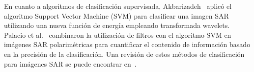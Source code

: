 \documentclass[11pt]{article}
\begin{document}
En cuanto a algoritmos de clasificación supervisada, Akbarizadeh~\cite{Akbarizadeh2012} aplicó el algoritmo Support Vector Machine (SVM) para clasificar una imagen SAR utilizando una nueva función de energía empleando transformada wavelets. 
Palacio et al.~\cite{Palacio2019} combinaron la utilización de filtros con el algoritmo SVM en imágenes SAR polarimétricas para cuantificar el contenido de información basado en la precisión de la clasificación.  
Una revisión de estos métodos de clasificación para imágenes SAR se puede encontrar en~\cite{Parikh2020}. 









\end{document}
